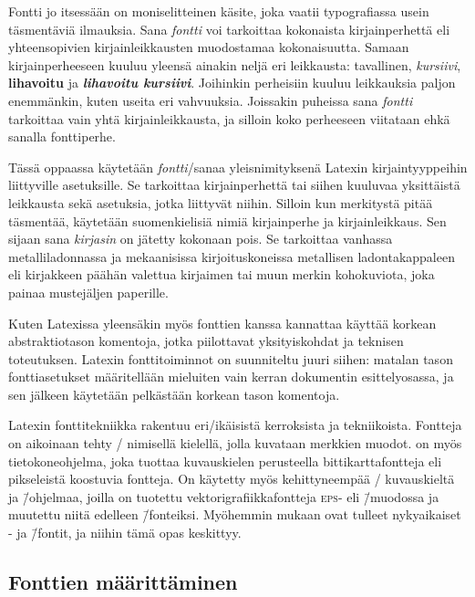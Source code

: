 Fontti jo itsessään on moniselitteinen käsite, joka vaatii typografiassa
usein täsmentäviä ilmauksia. Sana \emph{fontti} voi tarkoittaa
kokonaista kirjainperhettä eli yhteensopivien kirjainleikkausten
muodostamaa kokonaisuutta. Samaan kirjainperheeseen kuuluu yleensä
ainakin neljä eri leikkausta: tavallinen, \textit{kursiivi},
\textbf{lihavoitu} ja \textbf{\textit{lihavoitu kursiivi}}. Joihinkin
perheisiin kuuluu leikkauksia paljon enemmänkin, kuten useita eri
vahvuuksia. Joissakin puheissa sana \emph{fontti} tarkoittaa vain yhtä
kirjainleikkausta, ja silloin koko perheeseen viitataan ehkä sanalla
fonttiperhe.

Tässä oppaassa käytetään \emph{fontti}\-/sanaa yleisnimityksenä Latexin
kirjaintyyppeihin liittyville asetuksille. Se tarkoittaa kirjainperhettä
tai siihen kuuluvaa yksittäistä leikkausta sekä asetuksia, jotka
liittyvät niihin. Silloin kun merkitystä pitää täsmentää, käytetään
suomenkielisiä nimiä kirjainperhe ja kirjainleikkaus. Sen sijaan sana
\emph{kirjasin} on jätetty kokonaan pois. Se tarkoittaa vanhassa
metalliladonnassa ja mekaanisissa kirjoituskoneissa metallisen
ladontakappaleen eli kirjakkeen päähän valettua kirjaimen tai muun
merkin kohokuviota, joka painaa mustejäljen paperille.

Kuten Latexissa yleensäkin myös fonttien kanssa kannattaa käyttää
korkean abstraktiotason komentoja, jotka piilottavat yksityiskohdat ja
teknisen toteutuksen. Latexin fonttitoiminnot on suunniteltu juuri
siihen: matalan tason fonttiasetukset määritellään mieluiten vain kerran
dokumentin esittelyosassa, ja sen jälkeen käytetään pelkästään korkean
tason komentoja.

Latexin fonttitekniikka rakentuu eri\-/ikäisistä kerroksista ja
tekniikoista. Fontteja on aikoinaan tehty
\-/ nimisellä kielellä, jolla
kuvataan merkkien muodot.  on myös tietokoneohjelma,
joka tuottaa kuvauskielen perusteella bittikarttafontteja eli
pikseleistä koostuvia fontteja. On käytetty myös kehittyneempää
\-/ kuvauskieltä ja \=/ohjelmaa,
joilla on tuotettu vektorigrafiikkafontteja \textsc{eps}- eli
 \=/muodossa ja muutettu niitä
edelleen  \=/fonteiksi. Myöhemmin mukaan
ovat tulleet nykyaikaiset - ja 
\=/fontit, ja niihin tämä opas keskittyy.

\subsection{Fonttien määrittäminen}
\label{luku/fontin-valinta}

